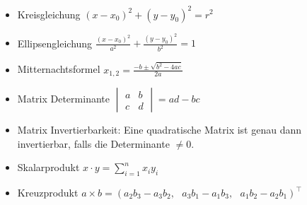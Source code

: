 \begin{Diverses}{}{}
    \begin{itemize}
    \item Kreisgleichung $(x - x_0)^2 + (y - y_0)^2 = r^2$
    \item Ellipsengleichung $\frac{(x-x_0)^2}{a^2} + \frac{(y-y_0)^2}{b^2} = 1$
    \item Mitternachtsformel $x_{1, 2} = \frac{-b \pm \sqrt{b^2 - 4ac}}{2a}$
    \item Matrix Determinante $\begin{vmatrix}
        a & b\\
        c & d
    \end{vmatrix} = ad-bc$
    \item Matrix Invertierbarkeit: Eine quadratische Matrix ist genau dann invertierbar, falls die Determinante $\neq 0$.
    \item Skalarprodukt $x \cdot y = \sum_{i=1}^n x_i y_i$
    \item Kreuzprodukt $a \times b = (a_2b_3-a_3b_2, ~~~ a_3b_1-a_1b_3, ~~~ a_1b_2-a_2b_1)^\top$
    \end{itemize}
\end{Diverses}

